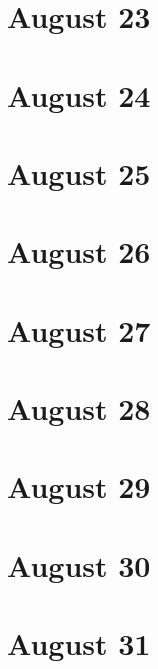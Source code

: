 \section{August 23}

\section{August 24}

\section{August 25}

\section{August 26}

\section{August 27}

\section{August 28}

\section{August 29}

\section{August 30}

\section{August 31}

